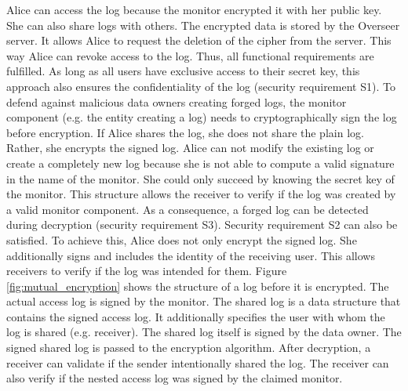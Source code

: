 \documentclass[../main.tex]{subfiles}
\begin{document}
Alice can access the log because the monitor encrypted it with her public key.
She can also share logs with others.
The encrypted data is stored by the Overseer server.
It allows Alice to request the deletion of the cipher from the server.
This way Alice can revoke access to the log.
Thus, all functional requirements are fulfilled.
As long as all users have exclusive access to their secret key, this approach also ensures the confidentiality of the log (security requirement S1).
To defend against malicious data owners creating forged logs, the monitor component (e.g. the entity creating a log) needs to cryptographically sign the log before encryption.
If Alice shares the log, she does not share the plain log.
Rather, she encrypts the signed log.
Alice can not modify the existing log or create a completely new log because she is not able to compute a valid signature in the name of the monitor.
She could only succeed by knowing the secret key of the monitor.
This structure allows the receiver to verify if the log was created by a valid monitor component.
As a consequence, a forged log can be detected during decryption (security requirement S3).
Security requirement S2 can also be satisfied.
To achieve this, Alice does not only encrypt the signed log.
She additionally signs and includes the identity of the receiving user.
This allows receivers to verify if the log was intended for them.
Figure \ref{fig:mutual_encryption} shows the structure of a log before it is encrypted.
The actual access log is signed by the monitor.
The shared log is a data structure that contains the signed access log.
It additionally specifies the user with whom the log is shared (e.g. receiver).
The shared log itself is signed by the data owner.
The signed shared log is passed to the encryption algorithm.
After decryption, a receiver can validate if the sender intentionally shared the log.
The receiver can also verify if the nested access log was signed by the claimed monitor.
\end{document}
